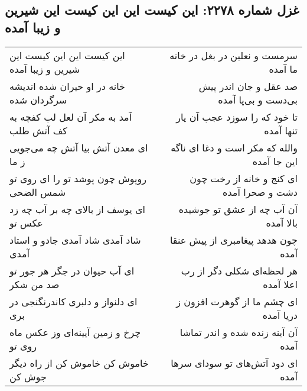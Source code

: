 \begin{center}
\section*{غزل شماره ۲۲۷۸: این کیست این این کیست این شیرین و زیبا آمده}
\label{sec:2278}
\begin{longtable}{l p{0.5cm} r}
این کیست این این کیست این شیرین و زیبا آمده
&&
سرمست و نعلین در بغل در خانه ما آمده
\\
خانه در او حیران شده اندیشه سرگردان شده
&&
صد عقل و جان اندر پیش بی‌دست و بی‌پا آمده
\\
آمد به مکر آن لعل لب کفچه به کف آتش طلب
&&
تا خود که را سوزد عجب آن یار تنها آمده
\\
ای معدن آتش بیا آتش چه می‌جویی ز ما
&&
والله که مکر است و دغا ای ناگه این جا آمده
\\
روپوش چون پوشد تو را ای روی تو شمس الضحی
&&
ای کنج و خانه از رخت چون دشت و صحرا آمده
\\
ای یوسف از بالای چه بر آب چه زد عکس تو
&&
آن آب چه از عشق تو جوشیده بالا آمده
\\
شاد آمدی شاد آمدی جادو و استاد آمدی
&&
چون هدهد پیغامبری از پیش عنقا آمده
\\
ای آب حیوان در جگر هر جور تو صد من شکر
&&
هر لحظه‌ای شکلی دگر از رب اعلا آمده
\\
ای دلنواز و دلبری کاندرنگنجی در بری
&&
ای چشم ما از گوهرت افزون ز دریا آمده
\\
چرخ و زمین آیینه‌ای وز عکس ماه روی تو
&&
آن آینه زنده شده و اندر تماشا آمده
\\
خاموش کن خاموش کن از راه دیگر جوش کن
&&
ای دود آتش‌های تو سودای سرها آمده
\\
\end{longtable}
\end{center}
